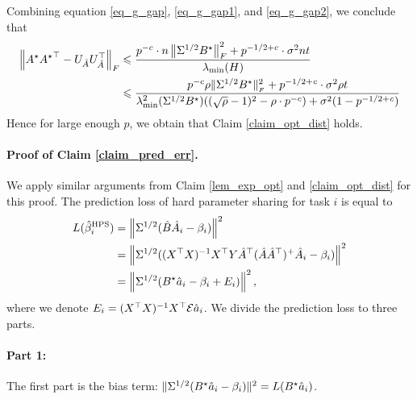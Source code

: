 	Combining equation \eqref{eq_g_gap}, \eqref{eq_g_gap1}, and \eqref{eq_g_gap2}, we conclude that
	\begin{align*}
		\left\| A^{\star} {A^{\star}}^{\top}- U_{\hat{A}} U_{\hat{A}}^{\top} \right\|_{F}
		&\leqslant \frac{p^{-c} \cdot n \left\| \Sigma^{1/2} B^{\star} \right\|_{F}^2 + p^{-1/2 + c} \cdot \sigma^2 nt} {\lambda_{\min}(H)} \\
		&\leqslant \frac{p^{-c} \rho \|\Sigma^{1/2} B^{\star}\|_{_{F}}^2 + p^{-1/2 + {\mathit{c}}} \cdot \sigma^2 \rho t}{\lambda_{\min}^2(\Sigma^{1/2} B^{\star}) ((\sqrt{\rho} - 1)^2 - \rho \cdot p^{-c}) + \sigma^2 (1 - p^{-1/2 + {\mathit{c}}})}
	\end{align*}
	Hence for large enough $p$, we obtain that Claim \ref{claim_opt_dist} holds.
	\fi
	

	\paragraph{Proof of Claim \ref{claim_pred_err}.}
	We apply similar arguments from Claim \ref{lem_exp_opt} and \ref{claim_opt_dist} for this proof.
	The prediction loss of hard parameter sharing for task $i$ is equal to
	\begin{align*}
		L(\hat{\beta}_i^{\textup{HPS}}) &= \left\| \Sigma^{1/2} (\hat{B} \hat{A}_i - \beta_i) \right\|^2 \\
		&= \left\| \Sigma^{1/2} ((X^{\top} X)^{-1} X^{\top} Y \hat{A}^{\top} (\hat{A} \hat{A}^{\top})^{+} \hat{A}_i - \beta_i) \right\|^2 \\
		&= \left\| \Sigma^{1/2} (B^{\star} \hat{a}_i - \beta_i + E_i) \right\|^2,
	\end{align*}
	where we denote $E_i = (X^{\top} X)^{-1} X^{\top} \mathcal{E} \hat{a}_i$.
	We divide the prediction loss to three parts.

	\paragraph{Part 1:} The first part is the bias term:
	$\|\Sigma^{1/2} (B^{\star} \hat{a}_i - \beta_i)\|^2 = L(B^{\star} \hat{a}_i)$.

